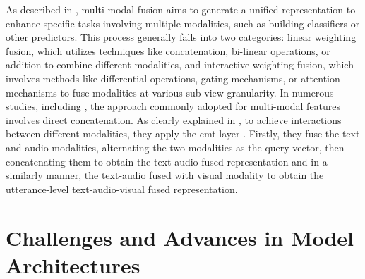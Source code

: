     As described in \cite{dialoguetrm}, multi-modal fusion aims to generate a unified representation to enhance specific tasks involving multiple modalities, such as building classifiers or other predictors. This process generally falls into two categories: linear weighting fusion, which utilizes techniques like concatenation, bi-linear operations, or addition to combine different modalities, and interactive weighting fusion, which involves methods like differential operations, gating mechanisms, or attention mechanisms to fuse modalities at various sub-view granularity. In numerous studies, including \cite{m2fnet, dialoguernn, multiemo}, the approach commonly adopted for multi-modal features involves direct concatenation. As clearly explained in \cite{fmmt}, to achieve interactions between different modalities, they apply the \ac{cmt} layer \cite{cmt}. Firstly, they fuse the text and audio modalities, alternating the two modalities as the query vector, then concatenating them to obtain the text-audio fused representation and in a similarly manner, the text-audio fused with visual modality to obtain the utterance-level text-audio-visual fused representation.


\section{Challenges and Advances in Model Architectures}

